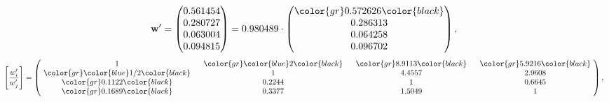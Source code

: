 \begin{example}
\begin{equation*}
\mathbf{w}^{\prime} =
\begin{pmatrix}
0.561454\\
0.280727\\
0.063004\\
0.094815
\end{pmatrix} =
0.980489\cdot
\begin{pmatrix}
\color{gr} 0.572626\color{black} \\
0.286313\\
0.064258\\
0.096702
\end{pmatrix},
\end{equation*}
\begin{equation*}
\left[ \frac{{w}^{\prime}_i}{{w}^{\prime}_j} \right] =
\begin{pmatrix}
$\,\,$ 1 $\,\,$ & $\,\,$\color{gr} \color{blue} 2\color{black} $\,\,$ & $\,\,$\color{gr} 8.9113\color{black} $\,\,$ & $\,\,$\color{gr} 5.9216\color{black} $\,\,$ \\
$\,\,$\color{gr} \color{blue}  1/2\color{black} $\,\,$ & $\,\,$ 1 $\,\,$ & $\,\,$4.4557$\,\,$ & $\,\,$2.9608  $\,\,$ \\
$\,\,$\color{gr} 0.1122\color{black} $\,\,$ & $\,\,$0.2244$\,\,$ & $\,\,$ 1 $\,\,$ & $\,\,$0.6645 $\,\,$ \\
$\,\,$\color{gr} 0.1689\color{black} $\,\,$ & $\,\,$0.3377$\,\,$ & $\,\,$1.5049$\,\,$ & $\,\,$ 1  $\,\,$ \\
\end{pmatrix},
\end{equation*}
\end{example}
\newpage
